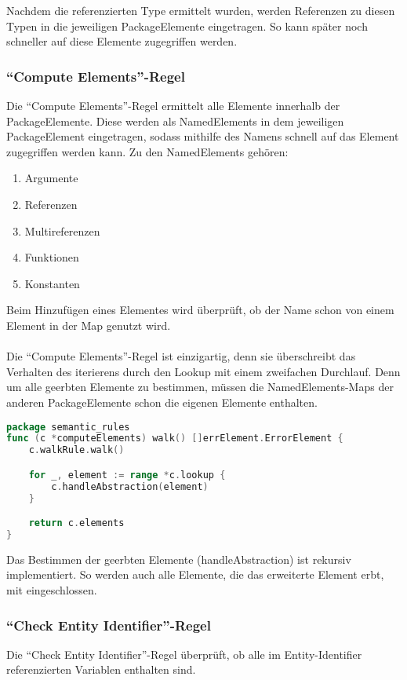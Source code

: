 \documentclass[./einleitung.tex]{subfiles}
\begin{document}
    Nachdem die referenzierten Type ermittelt wurden, werden Referenzen zu diesen Typen in die jeweiligen PackageElemente eingetragen.
    So kann später noch schneller auf diese Elemente zugegriffen werden.

    \subsubsection{``Compute Elements''-Regel}
    Die ``Compute Elements''-Regel ermittelt alle Elemente innerhalb der PackageElemente.
    Diese werden als NamedElements in dem jeweiligen PackageElement eingetragen, sodass mithilfe des Namens schnell auf das Element zugegriffen werden kann.
    Zu den NamedElements gehören:
    \begin{enumerate}
        \item Argumente
        \item Referenzen
        \item Multireferenzen
        \item Funktionen
        \item Konstanten
    \end{enumerate}
    Beim Hinzufügen eines Elementes wird überprüft, ob der Name schon von einem Element in der Map genutzt wird. \\ \\
    Die ``Compute Elements''-Regel ist einzigartig, denn sie überschreibt das Verhalten des iterierens durch den Lookup mit einem zweifachen Durchlauf.
    Denn um alle geerbten Elemente zu bestimmen, müssen die NamedElements-Maps der anderen PackageElemente schon die eigenen Elemente enthalten.
    \begin{lstlisting}[language=Go]
package semantic_rules
func (c *computeElements) walk() []errElement.ErrorElement {
	c.walkRule.walk()

	for _, element := range *c.lookup {
		c.handleAbstraction(element)
	}

	return c.elements
}
    \end{lstlisting}
    Das Bestimmen der geerbten Elemente (handleAbstraction) ist rekursiv implementiert.
    So werden auch alle Elemente, die das erweiterte Element erbt, mit eingeschlossen.

    \subsubsection{``Check Entity Identifier''-Regel}
    Die ``Check Entity Identifier''-Regel überprüft, ob alle im Entity-Identifier referenzierten Variablen enthalten sind.
\end{document}
